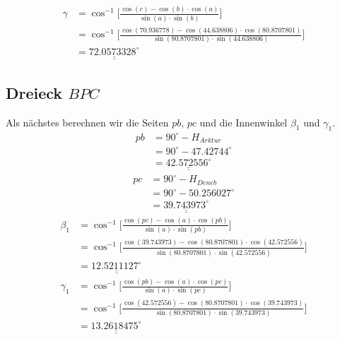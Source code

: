 	\begin{align}
	\gamma &=  \cos^{-1}  \bigg[\frac{\cos(c)-\cos(b) \cdot \cos(a)}{\sin(a) \cdot \sin(b)}\bigg] \nonumber \\
	&=  \cos^{-1}  \bigg[\frac{\cos(70.936778)-\cos(44.638806) \cdot \cos(80.8707801)}{\sin(80.8707801) \cdot \sin(44.638806)}\bigg] \nonumber \\
	&=\underline{\underline{72.0573328^\circ}} \nonumber
\end{align}
\subsection{Dreieck $BPC$}
Als nächstes berechnen wir die Seiten $pb$, $pc$ und die Innenwinkel $\beta_1$ und $\gamma_1$.
\begin{align}
	pb&=90^\circ - H_{Arktur} \nonumber \\
	&= 90^\circ - 47.42744^\circ \nonumber \\
	&= \underline{\underline{42.572556^\circ}} \nonumber
\end{align}
\begin{align}
	pc &= 90^\circ - H_{Deneb} \nonumber \\
	&= 90^\circ - 50.256027^\circ \nonumber \\
	&= \underline{\underline{39.743973^\circ}} \nonumber
\end{align}
\begin{align}
	\beta_1 &= \cos^{-1}  \bigg[\frac{\cos(pc)-\cos(a) \cdot \cos(pb)}{\sin(a) \cdot \sin(pb)}\bigg] \nonumber \\
	&= \cos^{-1}  \bigg[\frac{\cos(39.743973)-\cos(80.8707801) \cdot \cos(42.572556)}{\sin(80.8707801) \cdot \sin(42.572556)}\bigg] \nonumber \\
	&=\underline{\underline{12.5211127^\circ}} \nonumber
\end{align}
\begin{align}
	\gamma_1 &= \cos^{-1}  \bigg[\frac{\cos(pb)-\cos(a) \cdot \cos(pc)}{\sin(a) \cdot \sin(pc)}\bigg] \nonumber \\
	&= \cos^{-1}  \bigg[\frac{\cos(42.572556)-\cos(80.8707801) \cdot \cos(39.743973)}{\sin(80.8707801) \cdot \sin(39.743973)}\bigg] \nonumber \\
	&=\underline{\underline{13.2618475^\circ}} \nonumber
\end{align}

